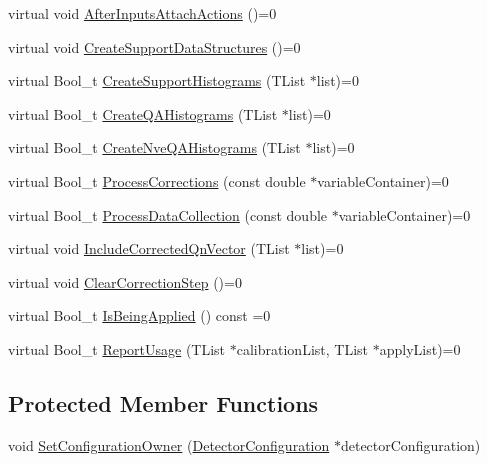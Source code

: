 \begin{DoxyCompactItemize}
\item 
virtual void \mbox{\hyperlink{classQn_1_1CorrectionStepBase_a0c32c1fceb1f1be225ef0407a806f9e2}{After\+Inputs\+Attach\+Actions}} ()=0
\item 
virtual void \mbox{\hyperlink{classQn_1_1CorrectionStepBase_a800ac634950eb231d72033b03cc899cd}{Create\+Support\+Data\+Structures}} ()=0
\item 
virtual Bool\+\_\+t \mbox{\hyperlink{classQn_1_1CorrectionStepBase_a156c05dc7a6a8e149674ccfb11e596c9}{Create\+Support\+Histograms}} (T\+List $\ast$list)=0
\item 
virtual Bool\+\_\+t \mbox{\hyperlink{classQn_1_1CorrectionStepBase_a21f58f5d91209c1c74d0928cf0b3e26d}{Create\+Q\+A\+Histograms}} (T\+List $\ast$list)=0
\item 
virtual Bool\+\_\+t \mbox{\hyperlink{classQn_1_1CorrectionStepBase_acb488e715005f027e39c21ae5f4684da}{Create\+Nve\+Q\+A\+Histograms}} (T\+List $\ast$list)=0
\item 
virtual Bool\+\_\+t \mbox{\hyperlink{classQn_1_1CorrectionStepBase_a773ff3bbe5e7c8bcfb11a4f4138af1e1}{Process\+Corrections}} (const double $\ast$variable\+Container)=0
\item 
virtual Bool\+\_\+t \mbox{\hyperlink{classQn_1_1CorrectionStepBase_a77005ff85ae351cb290fee4adb41c029}{Process\+Data\+Collection}} (const double $\ast$variable\+Container)=0
\item 
virtual void \mbox{\hyperlink{classQn_1_1CorrectionStepBase_a5f8936b56bfe4e5a7bf1e79775241500}{Include\+Corrected\+Qn\+Vector}} (T\+List $\ast$list)=0
\item 
virtual void \mbox{\hyperlink{classQn_1_1CorrectionStepBase_a879c47010a868c19bd08042445662e2e}{Clear\+Correction\+Step}} ()=0
\item 
virtual Bool\+\_\+t \mbox{\hyperlink{classQn_1_1CorrectionStepBase_aa99ab21886c2b4d8c3c6e1f60b84acc9}{Is\+Being\+Applied}} () const =0
\item 
virtual Bool\+\_\+t \mbox{\hyperlink{classQn_1_1CorrectionStepBase_a235ae6623fbbe26601b95f7e76753bfd}{Report\+Usage}} (T\+List $\ast$calibration\+List, T\+List $\ast$apply\+List)=0
\end{DoxyCompactItemize}
\subsection*{Protected Member Functions}
\begin{DoxyCompactItemize}
\item 
void \mbox{\hyperlink{classQn_1_1CorrectionStepBase_a9beb30d4220e357047706383b0a490fb}{Set\+Configuration\+Owner}} (\mbox{\hyperlink{classQn_1_1DetectorConfiguration}{Detector\+Configuration}} $\ast$detector\+Configuration)
\end{DoxyCompactItemize}
